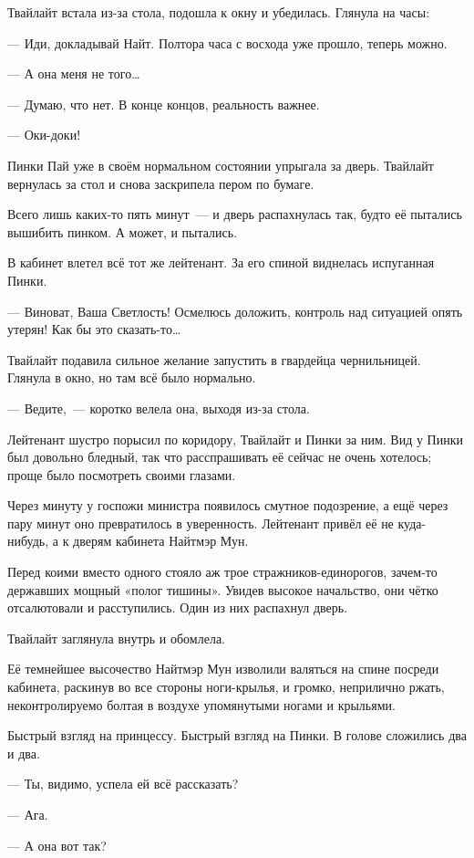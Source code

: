 \documentclass[twoside,a5paper,12pt]{extbook}
\begin{document}
Твайлайт встала из-за стола, подошла к окну и убедилась. Глянула на часы:

— Иди, докладывай Найт. Полтора часа с восхода уже прошло, теперь можно.

— А она меня не того…

— Думаю, что нет. В конце концов, реальность важнее.

— Оки-доки!

Пинки Пай уже в своём нормальном состоянии упрыгала за дверь. Твайлайт вернулась за стол и снова заскрипела пером по бумаге.

Всего лишь каких-то пять минут — и дверь распахнулась так, будто её пытались вышибить пинком. А может, и пытались. 

В кабинет влетел всё тот же лейтенант. За его спиной виднелась испуганная Пинки.

— Виноват, Ваша Светлость! Осмелюсь доложить, контроль над ситуацией опять утерян! Как бы это сказать-то…

Твайлайт подавила сильное желание запустить в гвардейца чернильницей. Глянула в окно, но там всё было нормально.

— Ведите, — коротко велела она, выходя из-за стола.

Лейтенант шустро порысил по коридору, Твайлайт и Пинки за ним. Вид у Пинки был довольно бледный, так что расспрашивать её сейчас не очень хотелось; проще было посмотреть своими глазами.

Через минуту у госпожи министра появилось смутное подозрение, а ещё через пару минут оно превратилось в уверенность. Лейтенант привёл её не куда-нибудь, а к дверям кабинета Найтмэр Мун.  

Перед коими вместо одного стояло аж трое стражников-единорогов, зачем-то державших мощный «полог тишины». Увидев высокое начальство, они чётко отсалютовали и расступились. Один из них распахнул дверь.

Твайлайт заглянула внутрь и обомлела.

Её темнейшее высочество Найтмэр Мун изволили валяться на спине посреди кабинета, раскинув во все стороны ноги-крылья, и громко, неприлично ржать, неконтролируемо болтая в воздухе упомянутыми ногами и крыльями.

Быстрый взгляд на принцессу. Быстрый взгляд на Пинки. В голове сложились два и два.

— Ты, видимо, успела ей всё рассказать?

— Ага.

— А она вот так?
\end{document}
